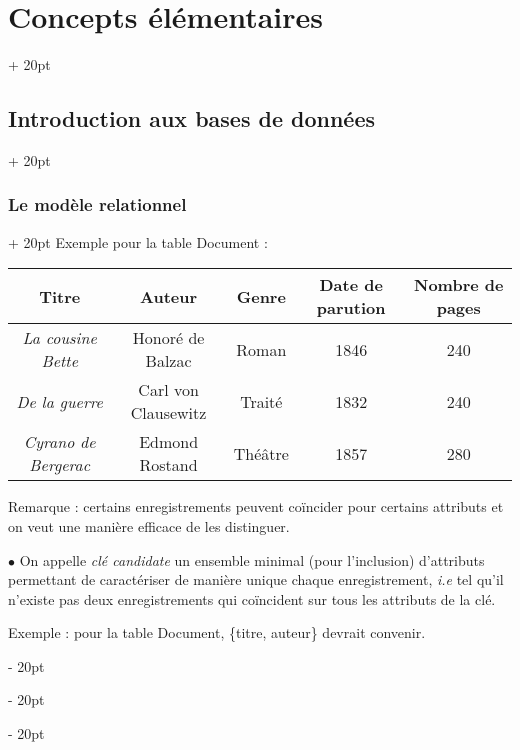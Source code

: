 \documentclass[a4paper, 12pt, twoside]{article}
\newcommand{\ind}[1][20pt]{\advance\leftskip + #1}
\newcommand{\deind}[1][20pt]{\advance\leftskip - #1}
\newenvironment{indt}[2][20pt]{#2 \par \ind[#1]}{\par \deind} %
\begin{document}
\begin{indt}{\section{Concepts élémentaires}}
\begin{indt}{\subsection{Introduction aux bases de données}}
\begin{indt}{\subsubsection{Le modèle relationnel}}
                Exemple pour la table Document :
                \begin{center}
                    \begin{tabular}{|c|c|c|c|c|}
                        \hline
                        Titre
                        & Auteur
                        & Genre
                        & Date de parution
                        & Nombre de pages
                        \\
                        \hline
                        \textit{La cousine Bette}
                        & Honoré de Balzac
                        & Roman
                        & 1846
                        & 240
                        \\
                        \textit{De la guerre}
                        & Carl von Clausewitz
                        & Traité
                        & 1832
                        & 240
                        \\
                        \textit{Cyrano de Bergerac}
                        & Edmond Rostand
                        & Théâtre
                        & 1857
                        & 280
                        \\
                        \hline
                    \end{tabular}
                \end{center}
                
                \vspace{12pt}
                
                Remarque : certains enregistrements peuvent coïncider pour certains attributs et on veut une manière efficace de les distinguer.
                
                \vspace{12pt}
                
                $\bullet$ On appelle \textit{clé candidate} un ensemble minimal (pour l'inclusion) d'attributs permettant de caractériser de manière unique chaque enregistrement, \textit{i.e} tel qu'il n'existe pas deux enregistrements qui coïncident sur tous les attributs de la clé.
                
                \vspace{6pt}
                
                Exemple : pour la table Document, \{titre, auteur\} devrait convenir.
                
                \vspace{6pt}
                

\end{indt}
\end{indt}
\end{indt}
\end{document}
